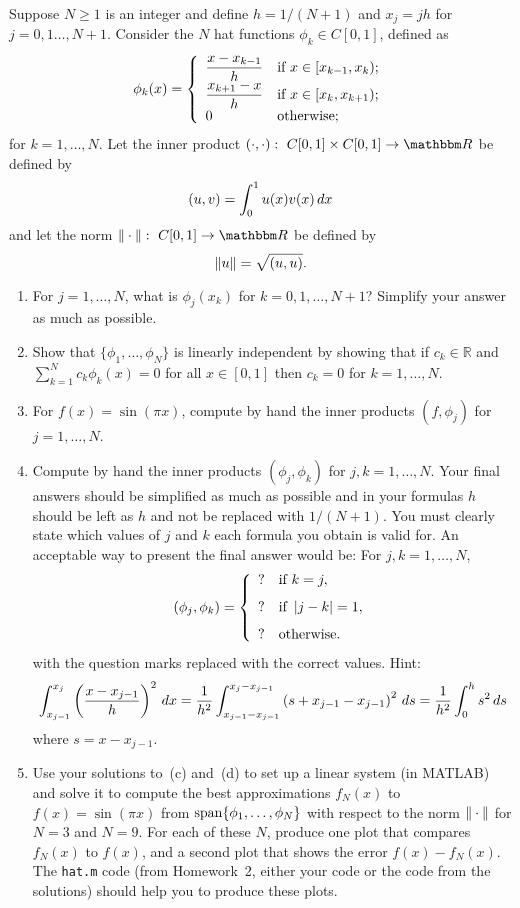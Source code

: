 
Suppose $N\ge 1$ is an integer and define $h = 1/(N+1)$ 
and $x_j = jh$ for $j = 0,1\ldots, N+1$.
Consider the $N$ hat functions $\phi_k\in C[0,1]$, defined as
\[
\phi_k(x) = \left\{
\begin{array}{ll}
\displaystyle{{x-x_{k-1}\over h}} & \mbox{if }x\in [x_{k-1}, x_k);\\
\displaystyle{{x_{k+1}-x\over h}} & \mbox{if }x\in [x_k, x_{k+1});\\
0 & \mbox{otherwise};
\end{array}\right.
\]
for $k=1,\ldots, N$. Let the inner product $\ip{\cdot,\cdot}:\mbox{ }C[0,1]\times C[0,1]\rightarrow\R$ be defined by
\[ (u,v) = \int_0^1 u(x)v(x)\, dx\] and let the norm $\norm{\cdot}:\mbox{ }C[0,1]\rightarrow\R$ be defined by
\[ \|u\| = \sqrt{(u,u)}.\]

\begin{enumerate}
\item For $j=1,\ldots,N$, what is $\phi_j(x_k)$ for $k=0,1,\ldots,N+1$? Simplify your answer as much as possible.
\\
\item Show that $\{\phi_1, \ldots, \phi_N\}$ is linearly independent by showing that if $c_k\in\mathbb{R}$ and $\displaystyle{\sum_{k=1}^N}c_k\phi_k(x)=0$ for all $x\in[0,1]$ then $c_k=0$ for $k=1,\ldots,N$.
\\
\item For $f(x) = \sin(\pi x)$, compute by hand the inner products $(f,\phi_j)$ for $j=1,\ldots, N$.
\\
\item Compute by hand the inner products $(\phi_j, \phi_k)$ for $j,k=1,\ldots, N$. Your final answers should be simplified as much as possible and in your formulas $h$ should be left as $h$ and not be replaced with $1/(N+1)$. You must clearly state which values of $j$ and $k$ each formula you obtain is valid for. An acceptable way to present the final answer would be:\newline
For $j,k=1,\ldots,N$,
\[
(\phi_j,\phi_k)=\left\{\begin{array}{ll}? & \mbox{if }k=j, \\[.75em] ? & \mbox{if }\left|j-k\right|=1, \\[.75em] ? & \mbox{otherwise}.\end{array}\right.
\]
with the question marks replaced with the correct values. Hint:
\[
\int_{x_{j-1}}^{x_j}\left({x-x_{j-1}\over h}\right)^2\,dx={1 \over h^2}\int_{x_{j-1}-x_{j-1}}^{x_j-x_{j-1}}\left(s+x_{j-1}-x_{j-1}\right)^2\,ds={1 \over h^2}\int_0^hs^2\,ds
\]
where $s=x-x_{j-1}$.
\\
\item Use your solutions to~(c) and~(d) to set up a linear system (in MATLAB) and solve it to compute the best approximations $f_N(x)$ to $f(x) = \sin(\pi x)$ from ${\rm span}\{\phi_1, \ldots, \phi_N\}$  with respect to the norm $\|\cdot\|$ for $N=3$ and $N=9$. For each of these $N$, produce one plot that compares $f_N(x)$ to $f(x)$, and a second plot that shows the error $f(x) - f_N(x)$. The \verb|hat.m| code (from Homework~2, either your code or the code from the solutions) should help you to produce these plots.
\end{enumerate}



